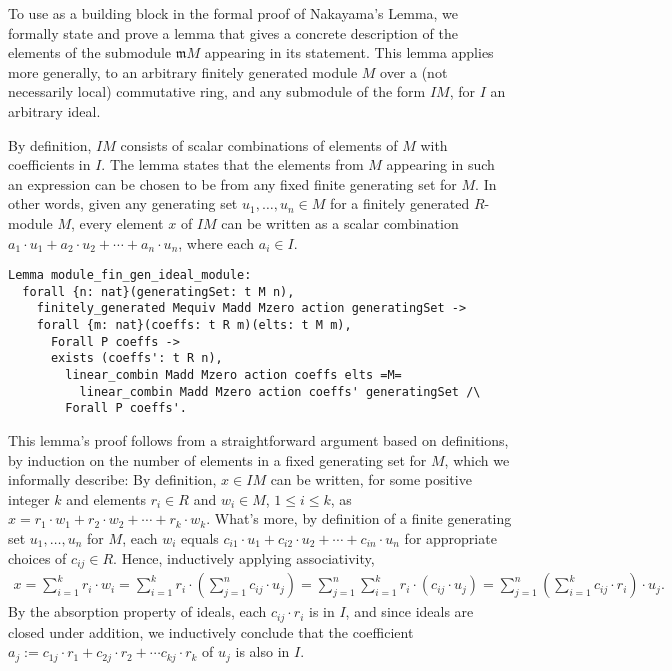 \documentclass{article}
\begin{document}
To use as a building block in the formal proof of Nakayama's Lemma, we 
formally state and prove a lemma that gives a concrete description of the
elements of the submodule $\mathfrak{m} M$  appearing in its statement. 
This lemma applies more generally, to an arbitrary finitely generated module
$M$ over a (not necessarily local) commutative ring, and any submodule of the
form $I M$, for $I$ an arbitrary ideal. 

By definition, $IM$ consists of scalar
combinations of elements of $M$ with coefficients in $I$. The lemma states that
the elements from $M$ appearing in such an expression can be chosen to be from any
fixed finite generating set for $M$. In other words, given any generating set
$u_{1},\dots, u_{n} \in M$  for a  finitely generated $R$-module $M$, every
element $x$ of $I M$ can be written as a scalar combination $a_1 \cdot u_1 +
a_2  \cdot u_2 + \cdots + a_n  \cdot u_n$, where each $a_i \in I$. 

\begin{verbatim}
Lemma module_fin_gen_ideal_module:
  forall {n: nat}(generatingSet: t M n),
    finitely_generated Mequiv Madd Mzero action generatingSet ->
    forall {m: nat}(coeffs: t R m)(elts: t M m),
      Forall P coeffs ->
      exists (coeffs': t R n),
        linear_combin Madd Mzero action coeffs elts =M=
          linear_combin Madd Mzero action coeffs' generatingSet /\
        Forall P coeffs'.
\end{verbatim}        

This lemma's proof follows from a straightforward argument based on definitions, by
induction on the number of elements in a fixed generating set for $M$, which we
informally describe: By definition, $x \in I M$ can  be written, for some
positive integer $k$ and elements $r_i \in R$ and $w_i \in M$,
$1 \leq i \leq k$, as $x = r_1 \cdot w_1 + r_2 \cdot w_2 + \cdots +
r_k \cdot w_k$. What's more, by definition of a finite generating set $u_{1},
\dots, u_{n}$ for $M$, each $w_i$ equals $c_{i1} \cdot u_1 + c_{i2} \cdot u_2 +
\cdots + c_{in} \cdot u_n$ for appropriate choices of $c_{ij} \in R$. Hence,
inductively applying associativity, 
\begin{align*}
  x = \sum_{i=1}^{k} r_i \cdot w_i
    = \sum_{i=1}^{k} r_i \cdot \left(\sum_{j=1}^n c_{ij} \cdot  u_j\right)
    = \sum_{j=1}^{n}\sum_{i=1}^{k} r_i \cdot (c_{ij} \cdot u_j) 
    = \sum_{j=1}^{n}\left(\sum_{i=1}^{k} c_{ij} \cdot r_i\right) \cdot u_j.   
\end{align*}
By the absorption property of ideals, each  $c_{ij}  \cdot r_i$ is in $I$, and since ideals
are closed under addition, we inductively conclude that the coefficient $a_j
:= c_{1j} \cdot  r_1 +  c_{2j} \cdot  r_2 +  \cdots c_{kj}\cdot r_k$ of $u_j$
is also in $I$. 
\end{document}
